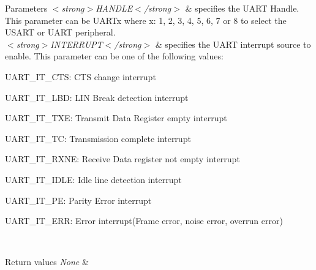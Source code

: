 \begin{DoxyParams}{Parameters}
{\em $<$strong$>$\+H\+A\+N\+D\+L\+E$<$/strong$>$} & specifies the U\+A\+RT Handle. This parameter can be U\+A\+R\+Tx where x\+: 1, 2, 3, 4, 5, 6, 7 or 8 to select the U\+S\+A\+RT or U\+A\+RT peripheral. \\
\hline
{\em $<$strong$>$\+I\+N\+T\+E\+R\+R\+U\+P\+T$<$/strong$>$} & specifies the U\+A\+RT interrupt source to enable. This parameter can be one of the following values\+: \begin{DoxyItemize}
\item U\+A\+R\+T\+\_\+\+I\+T\+\_\+\+C\+TS\+: C\+TS change interrupt \item U\+A\+R\+T\+\_\+\+I\+T\+\_\+\+L\+BD\+: L\+IN Break detection interrupt \item U\+A\+R\+T\+\_\+\+I\+T\+\_\+\+T\+XE\+: Transmit Data Register empty interrupt \item U\+A\+R\+T\+\_\+\+I\+T\+\_\+\+TC\+: Transmission complete interrupt \item U\+A\+R\+T\+\_\+\+I\+T\+\_\+\+R\+X\+NE\+: Receive Data register not empty interrupt \item U\+A\+R\+T\+\_\+\+I\+T\+\_\+\+I\+D\+LE\+: Idle line detection interrupt \item U\+A\+R\+T\+\_\+\+I\+T\+\_\+\+PE\+: Parity Error interrupt \item U\+A\+R\+T\+\_\+\+I\+T\+\_\+\+E\+RR\+: Error interrupt(\+Frame error, noise error, overrun error) \end{DoxyItemize}
\\
\hline
\end{DoxyParams}

\begin{DoxyRetVals}{Return values}
{\em None} & \\
\hline
\end{DoxyRetVals}
